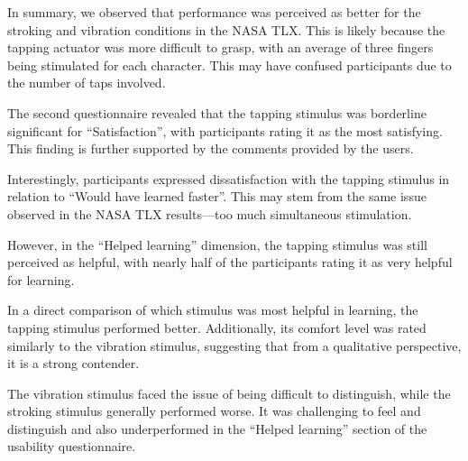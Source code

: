In summary, we observed that performance was perceived as better for the stroking and vibration conditions in the NASA TLX. This is likely because the tapping actuator was more difficult to grasp, with an average of three fingers being stimulated for each character. This may have confused participants due to the number of taps involved.

The second questionnaire revealed that the tapping stimulus was borderline significant for \enquote{Satisfaction}, with participants rating it as the most satisfying. This finding is further supported by the comments provided by the users.

Interestingly, participants expressed dissatisfaction with the tapping stimulus in relation to \enquote{Would have learned faster}. This may stem from the same issue observed in the NASA TLX results—too much simultaneous stimulation.

However, in the \enquote{Helped learning} dimension, the tapping stimulus was still perceived as helpful, with nearly half of the participants rating it as very helpful for learning.

In a direct comparison of which stimulus was most helpful in learning, the tapping stimulus performed better. Additionally, its comfort level was rated similarly to the vibration stimulus, suggesting that from a qualitative perspective, it is a strong contender.

The vibration stimulus faced the issue of being difficult to distinguish, while the stroking stimulus generally performed worse. It was challenging to feel and distinguish and also underperformed in the \enquote{Helped learning} section of the usability questionnaire.







